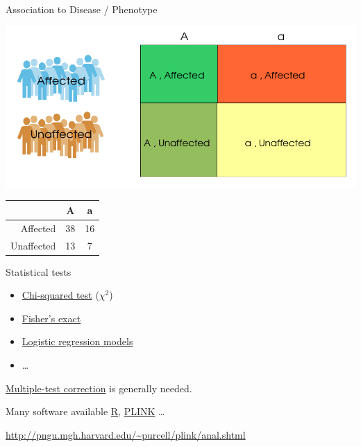 \documentclass{beamer}
\begin{document}
\begin{frame}{Association to Disease / Phenotype}

\centerline{\includegraphics[scale=0.3]{images/asoc_table_2.png}}

\begin{longtable}[c]{@{}rcc@{}}
\toprule
~ & A & a\tabularnewline
\midrule
\endhead
Affected & 38 & 16\tabularnewline
Unaffected & 13 & 7\tabularnewline
\bottomrule
\end{longtable}

\end{frame}

\begin{frame}{Statistical tests}

\begin{itemize}
\itemsep1pt\parskip0pt
\item
  \href{http://en.wikipedia.org/wiki/Chi-squared_test}{Chi-squared test}
  (\(\chi^2\))
\item
  \href{http://en.wikipedia.org/wiki/Fisher's_exact_test}{Fisher's
  exact}
\item
  \href{http://en.wikipedia.org/wiki/Logistic_regression}{Logistic
  regression models}
\item
  \ldots{}
\end{itemize}

\href{http://www.ncbi.nlm.nih.gov/pmc/articles/PMC2907892/}{Multiple-test
correction} is generally needed.

Many software available \href{http://cran.es.r-project.org/}{R},
\href{http://pngu.mgh.harvard.edu/~purcell/plink/}{PLINK} \ldots{}

\url{http://pngu.mgh.harvard.edu/~purcell/plink/anal.shtml}

\end{frame}

\end{document}
